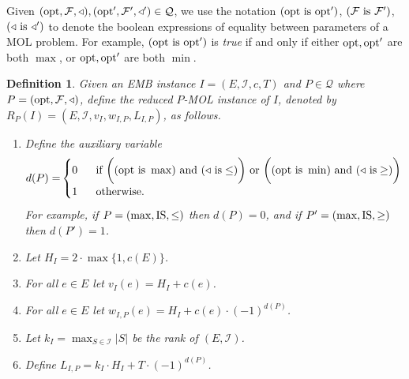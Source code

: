 \documentclass[11pt,letter]{article}
\newcommand{\opt}{\textnormal{opt}}
\newcommand{\IS}{\textnormal{IS}}
\newcommand{\cQ}{{\mathcal{Q}}}
\newcommand{\cI}{{\mathcal{I}}}
\newcommand{\cF}{{\mathcal{F}}}
\newtheorem{definition}[lemma]{Definition}
\begin{document}
Given $(\opt,\cF,\triangleleft), (\opt',\cF',\triangleleft') \in \cQ$, we use the notation $(\opt \textnormal{ is } \opt')$,  $(\cF \textnormal{ is } \cF')$, $(\triangleleft \textnormal{ is } \triangleleft')$ to denote the boolean expressions of equality between parameters of a MOL problem. For example, $(\opt \textnormal{ is } \opt')$ is {\em true} if and only if either $\opt,\opt'$ are both $\max$, or $\opt,\opt'$ are both $\min$. 



\begin{definition}
	\label{def:reduction}
	Given an \textnormal{EMB} instance $I =(E,\cI,c,T)$ and  $P \in \cQ$ where $P = (\opt,\cF,\triangleleft)$, define the
	 {\em reduced $P$-MOL instance} of $I$, denoted by  $R_P(I) = (E,\cI,v_I,w_{I,P},L_{I,P})$, as follows.
	\begin{enumerate}
		\item Define the auxiliary variable 
		\begin{align*}
			d(P) = & \begin{cases}
				0 & ~~\textnormal{if  } \bigg((\opt \textnormal{ is } \max)  \textnormal{ and }   (\triangleleft \textnormal{ is}   \leq) \bigg) \textnormal{ or } 
				\bigg((\opt \textnormal{ is } \min)  \textnormal{ and }   (\triangleleft \textnormal{ is}   \geq) \bigg)\\
				1 & ~~\textnormal{otherwise.}
			\end{cases}
		\end{align*} For example, if $P = (\max,\IS,\leq)$ then $d(P) = 0$, and if  $P' = (\max,\IS,\geq)$ then $d(P') = 1$. 
		\item Let $H_I = 2 \cdot \max \{1, c(E)\}$.
		\item For all $e \in E$ let $v_I(e) =  H_I +c(e)$. 
		\item For all $e \in E$ let $w_{I,P}(e) =  H_I +c(e) \cdot (-1)^{d(P)}$.
		\item Let $k_I = \max_{S \in \cI} |S|$ be the rank of $(E,\cI)$. 
		\item Define $L_{I,P} = k_I \cdot H_I +T \cdot  (-1)^{d(P)}$. 
	\end{enumerate}
\end{definition}
\end{document}

